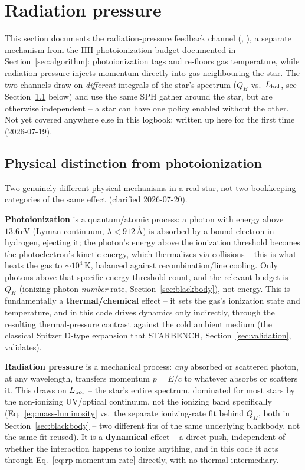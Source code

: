 \section{Radiation pressure}
\label{sec:radiation-pressure}

This section documents the radiation-pressure feedback channel
(,
), a separate mechanism
from the HII photoionization budget documented in
Section~\ref{sec:algorithm}: photoionization tags and re-floors gas
temperature, while radiation pressure injects momentum directly into
gas neighbouring the star. The two channels draw on \emph{different}
integrals of the star's spectrum ($Q_H$ vs.\ $L_{\rm bol}$, see
Section~\ref{sec:rp-vs-hii} below) and use the same SPH gather around
the star, but are otherwise independent -- a star can have one policy
enabled without the other. Not yet covered anywhere else in this
logbook; written up here for the first time (2026-07-19).

\subsection{Physical distinction from photoionization}
\label{sec:rp-vs-hii}

Two genuinely different physical mechanisms in a real star, not two
bookkeeping categories of the same effect (clarified 2026-07-20).

\textbf{Photoionization} is a quantum/atomic process: a photon with
energy above $13.6\,$eV (Lyman continuum, $\lambda<912\,$\AA) is
absorbed by a bound electron in hydrogen, ejecting it; the photon's
energy above the ionization threshold becomes the photoelectron's
kinetic energy, which thermalizes via collisions -- this is what heats
the gas to $\sim10^4\,$K, balanced against recombination/line cooling.
Only photons above that specific energy threshold count, and the
relevant budget is $Q_H$ (ionizing photon \emph{number} rate,
Section~\ref{sec:blackbody}), not energy. This is fundamentally a
\textbf{thermal/chemical} effect -- it sets the gas's ionization state
and temperature, and in this code drives dynamics only indirectly,
through the resulting thermal-pressure contrast against the cold
ambient medium (the classical Spitzer D-type expansion that STARBENCH,
Section~\ref{sec:validation}, validates).

\textbf{Radiation pressure} is a mechanical process: \emph{any}
absorbed or scattered photon, at any wavelength, transfers momentum
$p=E/c$ to whatever absorbs or scatters it. This draws on $L_{\rm
bol}$ -- the star's entire spectrum, dominated for most stars by the
non-ionizing UV/optical continuum, not the ionizing band specifically
(Eq.~\ref{eq:mass-luminosity} vs.\ the separate ionizing-rate fit
behind $Q_H$, both in Section~\ref{sec:blackbody} -- two different
fits of the same underlying blackbody, not the same fit reused). It is
a \textbf{dynamical} effect -- a direct push, independent of whether
the interaction happens to ionize anything, and in this code it acts
through Eq.~\ref{eq:rp-momentum-rate} directly, with no thermal
intermediary.

